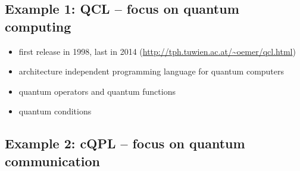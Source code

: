 \documentclass{beamer}
\begin{document}
\subsection{Example 1: QCL -- focus on quantum computing}

\begin{frame}{\insertsection}{\insertsubsection}
	\begin{itemize}
		\item first release in 1998, last in 2014 
		(\url{http://tph.tuwien.ac.at/~oemer/qcl.html})
		\item architecture independent programming language for quantum computers
		\item quantum operators and quantum functions
		\item quantum conditions
	\end{itemize}
	
\end{frame}

\begin{frame}{\insertsection}{\insertsubsection}
	
\end{frame}

\begin{frame}{\insertsection}{\insertsubsection}
	
\end{frame}

\begin{frame}{\insertsection}{\insertsubsection}
	
\end{frame}


\subsection{Example 2: cQPL -- focus on quantum communication}

\begin{frame}{\insertsection}{\insertsubsection}
    
\end{frame}
\end{document}
